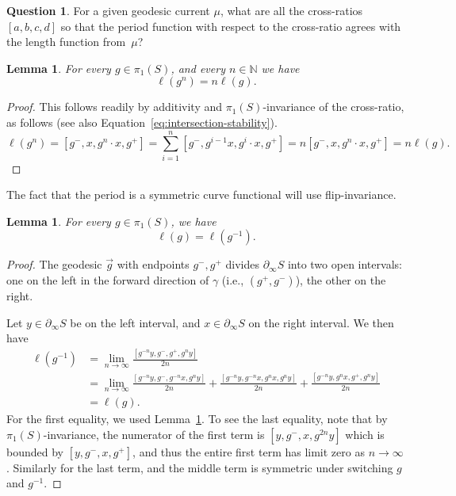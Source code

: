 \documentclass[11pt]{amsart}
\newcommand{\ora}[1]{\overrightarrow{#1}}
\numberwithin{equation}{section}
\numberwithin{figure}{section}
\newtheorem{lemma}[theorem]{Lemma}
\theoremstyle{definition}
\newtheorem{question}[theorem]{Question}
\theoremstyle{plain}
\begin{document}
\begin{question}
  For a given geodesic current $\mu$, what are all the cross-ratios
  $[a,b,c,d]$ so that the period function with respect to the
  cross-ratio agrees with the length function from~$\mu$?
  \label{que:howmany_crossratios}
\end{question}

\begin{lemma}
\label{lem:crossratio_stability}
For every $g \in \pi_1(S)$, and every $n \in \mathbb{N}$ we have
\[
\ell(g^n) = n\ell(g).
\]
\end{lemma}
\begin{proof}

This follows readily by additivity and $\pi_1(S)$-invariance of the
cross-ratio, as follows (see also Equation~\eqref{eq:intersection-stability}).
\begin{equation}\label{eq:crossratio-stability}
 \ell(g^n) =[g^-, x , g^n \cdot x, g^+]= \sum_{i=1}^{n} [g^-, g^{i-1}x , g^i \cdot x, g^+] = n[g^-, x , g^n \cdot x, g^+] = n \ell(g).
\end{equation}
\end{proof}

The fact that the period is a symmetric curve functional will use flip-invariance. 

\begin{lemma}    \label{lem:crinv}
    For every $g \in \pi_1(S)$, we have
    \[
    \ell(g)=\ell(g^{-1}).
    \]
\end{lemma}
\begin{proof}
The geodesic $\ora{g}$ with endpoints $g^-, g^+$ divides $\partial_{\infty}S$ into two open intervals:
one on the left in the forward direction of $\gamma$ (i.e.,
$(g^+,g^-)$), the other on the right.

Let $y \in  \partial_{\infty}S$ be on the left interval, and $x \in  \partial_{\infty}S$ on the right interval.
We then have
\begin{align*}
\ell(g^{-1}) &= \lim_{n \to \infty} \frac{[g^{-n}y, g^-, g^+, g^{n} y]}{2n} \\
  &= \lim_{n \to \infty}
     \frac{[g^{-n}y, g^-, g^{-n}x, g^{n} y]}{2n} +
     \frac{[g^{-n}y, g^{-n}x, g^{n}x, g^{n} y]}{2n} +
     \frac{[g^{-n}y, g^{n}x, g^+, g^{n} y]}{2n}\\
  &= \ell(g).
\end{align*}
For the first equality, we used Lemma~\ref{lem:crossratio_stability}.
To see the last equality, note that by $\pi_1(S)$-invariance, the
numerator of the first term is $[y,g^-,x,g^{2n}y]$ which is bounded by
$[y,g^-,x,g^+]$, and thus the entire first term has limit zero
as $n \to \infty$. Similarly for the last term, and the middle term is
symmetric under switching $g$ and $g^{-1}$.
\end{proof}
\end{document}
